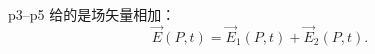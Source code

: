 \documentclass[11pt]{ctexart}
\begin{document}
p3--p5 给的是场矢量相加：
\[
\vec{E}(P,t)=\vec{E}_1(P,t)+\vec{E}_2(P,t).
\]
\end{document}
